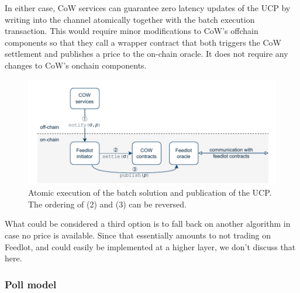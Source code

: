 \documentclass[a4paper,10pt]{article}
\theoremstyle{remark}
\begin{document}
In either case, CoW services can guarantee zero latency updates of the UCP by writing into the channel atomically together with the batch execution transaction. 
%
This would require minor modifications to CoW's offchain components so that they call a wrapper contract that both triggers the CoW settlement and publishes a price to the on-chain oracle.
%
It does not require any changes to CoW's onchain components.
%
\begin{figure}
  \begin{center}
    \vspace{2ex}
    \includegraphics[width=\textwidth * \real{0.8}]{diagrams/wrapper.pdf}
    \caption{Atomic execution of the batch solution and publication of the UCP. The ordering of (2) and (3) can be reversed.}
  \end{center}
\end{figure}
%

What could be considered a third option is to fall back on another algorithm in case no price is available. 
%
Since that essentially amounts to not trading on Feedlot, and could easily be implemented at a higher layer, we don't discuss that here.

\subsubsection{Poll model}
\end{document}
